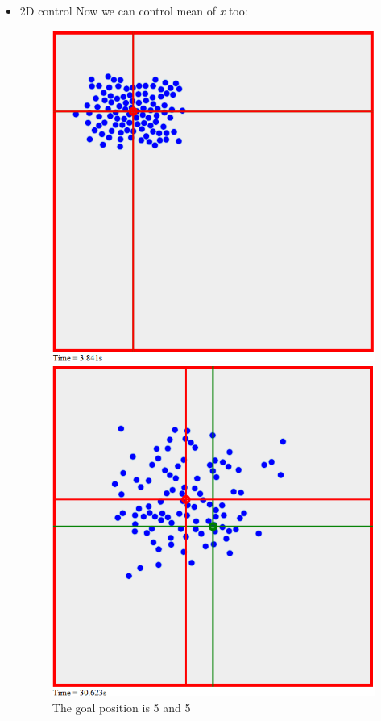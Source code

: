 \begin{itemize}
\item 2D control
Now we can control mean of \emph{x} too:
\begin{figure}[!htb]
\captionsetup{justification=centering}
  \includegraphics[width=\linewidth]{fig/2DControl3.png}
  \caption{The goal position is 5 and 5}
\endminipage\hfill
{}
  \includegraphics[width=\linewidth]{fig/2DControl2.png}

\end{figure}
\end{itemize}
